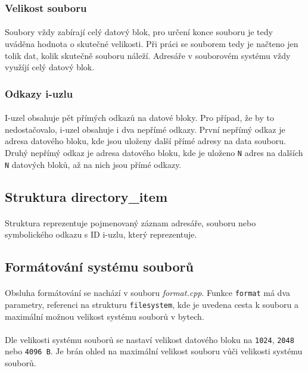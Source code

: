 \documentclass[12pt]{scrartcl}
\begin{document}
\subsubsection{Velikost souboru}
\paragraph{}
Soubory vždy zabírají celý datový blok, pro určení konce souboru je tedy uváděna hodnota o skutečné velikosti. Při práci se souborem tedy je načteno jen tolik dat, kolik skutečně souboru náleží. Adresáře v souborovém systému vždy využíjí celý datový blok.

\subsubsection{Odkazy i-uzlu}
\paragraph{}
I-uzel obsahuje pět přímých odkazů na datové bloky. Pro případ, že by to nedostačovalo, i-uzel obsahuje i dva nepřímé odkazy. První nepřímý odkaz je adresa datového bloku, kde jsou uloženy další přímé adresy na data souboru. Druhý nepřímý odkaz je adresa datového bloku, kde je uloženo \texttt{N} adres na dalších \texttt{N} datových bloků, až na nich jsou přímé odkazy.

\subsection{Struktura directory\_item}
\paragraph{}
Struktura reprezentuje pojmenovaný záznam adresáře, souboru nebo symbolického odkazu s ID i-uzlu, který reprezentuje. 

\subsection{Formátování systému souborů}
\paragraph{}
Obsluha formátování se nachází v souboru \textit{format.cpp}. Funkce \texttt{format} má dva parametry, referenci na strukturu \texttt{filesystem}, kde je uvedena cesta k souboru a maximální možnou velikost systému souborů v bytech.
\paragraph{}
Dle velikosti systému souborů se nastaví velikost datového bloku na \texttt{1024}, \texttt{2048} nebo \texttt{4096 B}. Je brán ohled na maximální velikost souboru vůči velikosti systému souborů.
\end{document}
